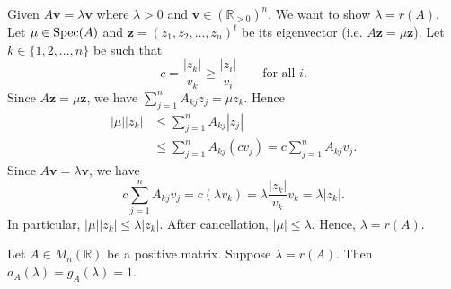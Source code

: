 \begin{pfbox}
Given $A\mathbf{v}=\lambda\mathbf{v}$ where $\lambda>0$ and $\mathbf{v}\in(\mathbb{R}_{>0})^n$. We want to show $\lambda=r(A)$.
Let $\mu\in\operatorname{Spec}(A)$ and $\mathbf{z}=(z_1,z_2,\dots,z_n)^t$ be its eigenvector (i.e. $A\mathbf{z}=\mu\mathbf{z}$).
Let $k\in\{1,2,\dots,n\}$ be such that
\[
c
=
\frac{|z_k|}{v_k}
\ge
\frac{|z_i|}{v_i}
\qquad
\text{for all } i.
\]
Since $A\mathbf{z}=\mu\mathbf{z}$, we have $\displaystyle\sum_{j=1}^n A_{kj}z_j=\mu z_k$.
Hence
\[
\begin{aligned}
|\mu| |z_k|
&\le
\sum_{j=1}^n A_{kj}|z_j| \\
&\le
\sum_{j=1}^n A_{kj}(cv_j)
=
 c\sum_{j=1}^n A_{kj}v_j.
\end{aligned}
\]
Since $A\mathbf{v}=\lambda\mathbf{v}$, we have
\[
c\sum_{j=1}^n A_{kj}v_j
=
c(\lambda v_k)
=
\lambda\frac{|z_k|}{v_k}v_k
=
\lambda |z_k|.
\]
In particular, $|\mu||z_k|\le \lambda|z_k|$.
After cancellation, $|\mu|\le \lambda$.
Hence, $\lambda=r(A)$.
\end{pfbox}


\begin{theorem}
Let $A\in M_n(\mathbb{R})$ be a positive matrix. Suppose $\lambda=r(A)$. Then $a_A(\lambda)=g_A(\lambda)=1$.
\end{theorem}

